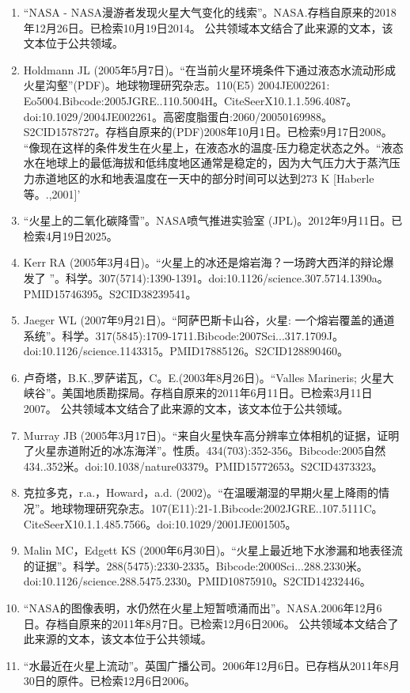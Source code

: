 \begin{enumerate}
\item “NASA - NASA漫游者发现火星大气变化的线索”。NASA.存档自原来的2018年12月26日。已检索10月19日2014。 公共领域本文结合了此来源的文本，该文本位于公共领域。
\item Holdmann JL (2005年5月7日)。“在当前火星环境条件下通过液态水流动形成火星沟壑”(PDF)。地球物理研究杂志。110(E5) 2004JE002261: Eo5004.Bibcode:2005JGRE..110.5004H。CiteSeerX10.1.1.596.4087。doi:10.1029/2004JE002261。高密度脂蛋白:2060/20050169988。S2CID1578727。存档自原来的(PDF)2008年10月1日。已检索9月17日2008。    “像现在这样的条件发生在火星上，在液态水的温度-压力稳定状态之外。“液态水在地球上的最低海拔和低纬度地区通常是稳定的，因为大气压力大于蒸汽压力赤道地区的水和地表温度在一天中的部分时间可以达到273 K [Haberle等。.,2001]'
\item “火星上的二氧化碳降雪”。NASA喷气推进实验室 (JPL)。2012年9月11日。已检索4月19日2025。
\item Kerr RA (2005年3月4日)。“火星上的冰还是熔岩海？一场跨大西洋的辩论爆发了 ”。科学。307(5714):1390-1391。doi:10.1126/science.307.5714.1390a。PMID15746395。S2CID38239541。  
\item Jaeger WL (2007年9月21日)。“阿萨巴斯卡山谷，火星: 一个熔岩覆盖的通道系统”。科学。317(5845):1709-1711.Bibcode:2007Sci...317.1709J。doi:10.1126/science.1143315。PMID17885126。S2CID128890460。  
\item 卢奇塔，B.K.,罗萨诺瓦，C。E.(2003年8月26日)。“Valles Marineris; 火星大峡谷”。美国地质勘探局。存档自原来的2011年6月11日。已检索3月11日2007。 公共领域本文结合了此来源的文本，该文本位于公共领域。
\item Murray JB (2005年3月17日)。“来自火星快车高分辨率立体相机的证据，证明了火星赤道附近的冰冻海洋”。性质。434(703):352-356。Bibcode:2005自然434..352米。doi:10.1038/nature03379。PMID15772653。S2CID4373323。  
\item 克拉多克，r.a.，Howard，a.d. (2002)。“在温暖潮湿的早期火星上降雨的情况”。地球物理研究杂志。107(E11):21-1.Bibcode:2002JGRE..107.5111C。CiteSeerX10.1.1.485.7566。doi:10.1029/2001JE001505。 
\item Malin MC，Edgett KS (2000年6月30日)。“火星上最近地下水渗漏和地表径流的证据”。科学。288(5475):2330-2335。Bibcode:2000Sci...288.2330米。doi:10.1126/science.288.5475.2330。PMID10875910。S2CID14232446。  
\item “NASA的图像表明，水仍然在火星上短暂喷涌而出”。NASA.2006年12月6日。存档自原来的2011年8月7日。已检索12月6日2006。 公共领域本文结合了此来源的文本，该文本位于公共领域。
\item “水最近在火星上流动”。英国广播公司。2006年12月6日。已存档从2011年8月30日的原件。已检索12月6日2006。

\end{enumerate}
